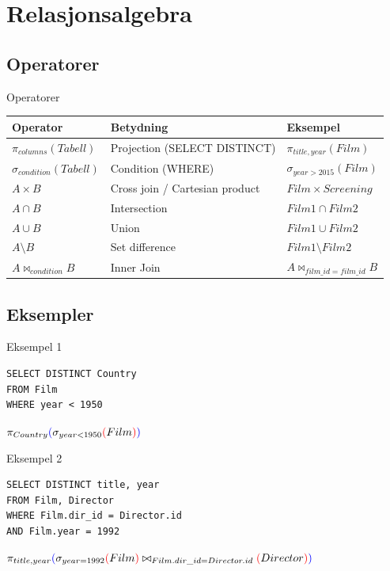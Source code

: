 \section{Relasjonsalgebra}
\subsection*{Operatorer}
\begin{frame}{Operatorer}
\begin{tabular}{l|l|l}
 Operator & Betydning & Eksempel\\\hline
 $\pi_{columns}(Tabell)$ & Projection (SELECT DISTINCT) & $\pi_{title, year}(Film)$\\\pause
 $\sigma_{condition}(Tabell)$ & Condition (WHERE) & $\sigma_{year > 2015}(Film)$\\\pause
 $A \times B$ & Cross join / Cartesian product & $Film \times Screening$\\\pause
 $A \cap B$ & Intersection & $Film1 \cap Film2$ \\\pause
 $A \cup B$ & Union & $Film1 \cup Film2$ \\\pause
 $A \setminus B$ & Set difference &  $Film1 \setminus Film2$\\\pause
 $A \bowtie_{condition} B$ & Inner Join & $A \bowtie_{{film\_id}={film\_id}} B$
\end{tabular}
\end{frame}

\subsection*{Eksempler}
\begin{frame}[fragile]{Eksempel 1}
\begin{verbatim}
SELECT DISTINCT Country
FROM Film
WHERE year < 1950
\end{verbatim}
\pause
$\pi_{Country}\textcolor{blue}{(}\sigma_{year < 1950}\textcolor{red}{(}Film\textcolor{red}{)}\textcolor{blue}{)}$
\end{frame}

\begin{frame}[fragile]{Eksempel 2}
\begin{verbatim}
SELECT DISTINCT title, year
FROM Film, Director
WHERE Film.dir_id = Director.id
AND Film.year = 1992
\end{verbatim}
\pause
$\pi_{title, year}\textcolor{blue}{(}\sigma_{year = 1992}\textcolor{red}{(}Film\textcolor{red}{)} \bowtie_{Film.dir\_id=Director.id}\textcolor{red}{(}Director\textcolor{red}{)}\textcolor{blue}{)}$
\end{frame}

